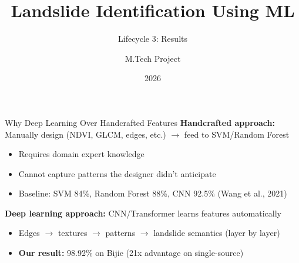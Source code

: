 \documentclass[aspectratio=169]{beamer}
\title{Landslide Identification Using ML}
\subtitle{Lifecycle 3: Results}
\author{M.Tech Project}
\date{2026}
\begin{document}
\begin{frame}
    \titlepage
\end{frame}

\begin{frame}{Why Deep Learning Over Handcrafted Features}
    \textbf{Handcrafted approach:} Manually design (NDVI, GLCM, edges, etc.) $\to$ feed to SVM/Random Forest
    \begin{itemize}
        \item Requires domain expert knowledge
        \item Cannot capture patterns the designer didn't anticipate
        \item Baseline: SVM 84\%, Random Forest 88\%, CNN 92.5\% (Wang et al., 2021)
    \end{itemize}

    \vspace{0.2cm}
    \textbf{Deep learning approach:} CNN/Transformer learns features automatically
    \begin{itemize}
        \item Edges $\to$ textures $\to$ patterns $\to$ landslide semantics (layer by layer)
        \item \textbf{Our result:} 98.92\% on Bijie (21x advantage on single-source)
    \end{itemize}
\end{frame}
\end{document}
